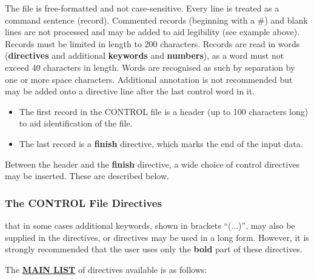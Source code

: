 The file is free-formatted and not case-sensitive.  Every line is
treated as a command sentence (record).  Commented records
(beginning with a \#) and blank lines are not processed and may be
added to aid legibility (see example above).  Records must be
limited in length to 200 characters.  Records are read in words
({\bf directives} and additional {\bf keywords} and {\bf
numbers}), as a word must not exceed 40 characters in length.
Words are recognised as such by separation by one or more space
characters.  Additional annotation is not recommended but may be
added onto a directive line after the last control word in it.

\begin{itemize}
\item The first record in the CONTROL file is a header (up to 100
characters long) to aid identification of the file.
\item The last record is a {\bf finish} directive, which marks
the end of the input data.
\end{itemize}

Between the header and the {\bf finish} directive, a wide choice
of control directives may be inserted.  These are described below.

\subsubsection{The CONTROL File Directives}
\label{control_options}

 that in some cases additional keywords, shown in
brackets ``(...)'', may also be supplied in the directives, or
directives may be used in a long form.  However, it is strongly
recommended that the user uses only the {\bf bold} part of these
directives.

The \uline{{\bf MAIN LIST}} of directives available is as follows:

